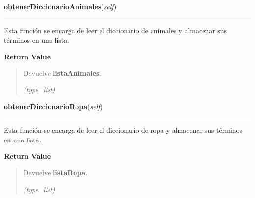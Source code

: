 \hspace{.8\funcindent}\begin{boxedminipage}{\funcwidth}

    \raggedright \textbf{obtenerDiccionarioAnimales}(\textit{self})

    \vspace{-1.5ex}

    \rule{\textwidth}{0.5\fboxrule}
\setlength{\parskip}{2ex}
    Esta función se encarga de leer el diccionario de animales y almacenar 
    sus términos en una lista.

\setlength{\parskip}{1ex}
      \textbf{Return Value}
    \vspace{-1ex}

      \begin{quote}
      Devuelve \textbf{listaAnimales}.

      {\it (type=list)}

      \end{quote}

    \end{boxedminipage}

    \label{funcionesTwitter:FuncionesTwitter:obtenerDiccionarioRopa}

    \vspace{0.5ex}

\hspace{.8\funcindent}\begin{boxedminipage}{\funcwidth}

    \raggedright \textbf{obtenerDiccionarioRopa}(\textit{self})

    \vspace{-1.5ex}

    \rule{\textwidth}{0.5\fboxrule}
\setlength{\parskip}{2ex}
    Esta función se encarga de leer el diccionario de ropa y almacenar sus 
    términos en una lista.

\setlength{\parskip}{1ex}
      \textbf{Return Value}
    \vspace{-1ex}

      \begin{quote}
      Devuelve \textbf{listaRopa}.

      {\it (type=list)}

      \end{quote}

    \end{boxedminipage}

